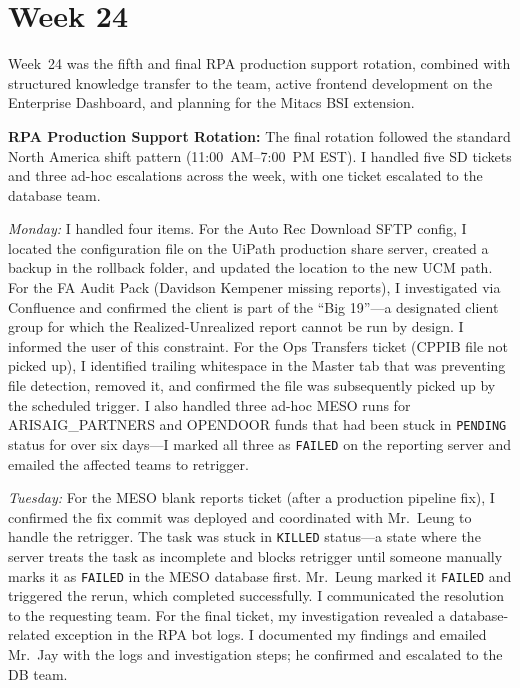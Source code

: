 \FloatBarrier

\section{Week 24}
\label{sec:week24}

Week~24 was the fifth and final RPA production support rotation, combined with structured knowledge transfer to the team, active frontend development on the Enterprise Dashboard, and planning for the Mitacs BSI extension.

\textbf{RPA Production Support Rotation:} 
The final rotation followed the standard North America shift pattern (11:00~AM--7:00~PM EST). I handled five SD tickets and three ad-hoc escalations across the week, with one ticket escalated to the database team.

\textit{Monday:} I handled four items. For the Auto Rec Download SFTP config, I located the configuration file on the UiPath production share server, created a backup in the rollback folder, and updated the location to the new UCM path. For the FA Audit Pack (Davidson Kempener missing reports), I investigated via Confluence and confirmed the client is part of the ``Big 19''---a designated client group for which the Realized-Unrealized report cannot be run by design. I informed the user of this constraint. For the Ops Transfers ticket (CPPIB file not picked up), I identified trailing whitespace in the Master tab that was preventing file detection, removed it, and confirmed the file was subsequently picked up by the scheduled trigger. I also handled three ad-hoc MESO runs for ARISAIG\_PARTNERS and OPENDOOR funds that had been stuck in \texttt{PENDING} status for over six days---I marked all three as \texttt{FAILED} on the reporting server and emailed the affected teams to retrigger.

\textit{Tuesday:} For the MESO blank reports ticket (after a production pipeline fix), I confirmed the fix commit was deployed and coordinated with Mr.\ Leung to handle the retrigger. The task was stuck in \texttt{KILLED} status---a state where the server treats the task as incomplete and blocks retrigger until someone manually marks it as \texttt{FAILED} in the MESO database first. Mr.\ Leung marked it \texttt{FAILED} and triggered the rerun, which completed successfully. I communicated the resolution to the requesting team. For the final ticket, my investigation revealed a database-related exception in the RPA bot logs. I documented my findings and emailed Mr.\ Jay with the logs and investigation steps; he confirmed and escalated to the DB team.

